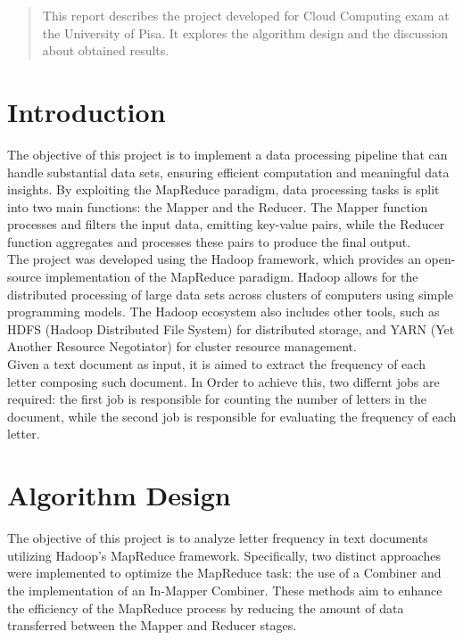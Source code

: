 \documentclass[a4paper, 12pt]{article}
\begin{document}


\tableofcontents
\newpage
\begin{abstract}

  \noindent This report describes the project developed for Cloud Computing exam at the University of Pisa. It explores the algorithm design and the discussion about obtained results.

\end{abstract}

\section{Introduction}
The objective of this project is to implement a data processing pipeline that can handle substantial data sets, ensuring efficient computation and meaningful data insights. By exploiting the MapReduce paradigm, data processing tasks is split into two main functions: the Mapper and the Reducer. The Mapper function processes and filters the input data, emitting key-value pairs, while the Reducer function aggregates and processes these pairs to produce the final output.\\
The project was developed using the Hadoop framework, which provides an open-source implementation of the MapReduce paradigm. Hadoop allows for the distributed processing of large data sets across clusters of computers using simple programming models. The Hadoop ecosystem also includes other tools, such as HDFS (Hadoop Distributed File System) for distributed storage, and YARN (Yet Another Resource Negotiator) for cluster resource management.\\
\noindent Given a text document as input, it is aimed to extract the frequency of each letter composing such document. In Order to achieve this, two differnt jobs are required: the first job is responsible for counting the number of letters in the document, while the second job is responsible for evaluating the frequency of each letter.\\

\section{Algorithm Design}
The objective of this project is to analyze letter frequency in text documents utilizing Hadoop's MapReduce framework. Specifically, two distinct approaches were implemented to optimize the MapReduce task: the use of a Combiner and the implementation of an In-Mapper Combiner. These methods aim to enhance the efficiency of the MapReduce process by reducing the amount of data transferred between the Mapper and Reducer stages.
\end{document}
